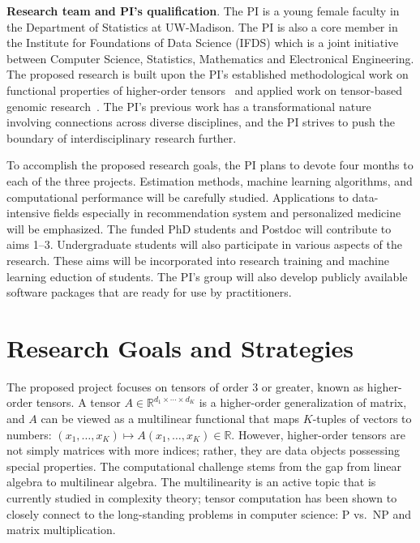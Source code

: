 \documentclass[10pt]{article}
\theoremstyle{definition}
\theoremstyle{definition}
\theoremstyle{definition}
\begin{document}
{\bf Research team and PI's qualification}. The PI is a young female faculty in the Department of Statistics at UW-Madison. The PI is also a core member in the Institute for Foundations of Data Science (IFDS) which is a joint initiative between Computer Science, Statistics, Mathematics and Electronical Engineering. The proposed research is built upon the PI’s established methodological work on functional properties of higher-order tensors~\cite{wang2017operator, wang2017tensor,zeng2019multiway,wang2018learning,lee2020tensor} and applied work on tensor-based genomic research~\cite{wang2019three,wang2018two}. The PI’s previous work has a transformational nature involving connections across diverse disciplines, and the PI strives to push the boundary of interdisciplinary research further.

To accomplish the proposed research goals, the PI plans to devote four months to each of the three projects. Estimation methods, machine learning algorithms, and computational performance will be carefully studied. Applications to data-intensive fields especially in recommendation system and personalized medicine will be emphasized. The funded PhD students and Postdoc will contribute to aims 1--3. Undergraduate students will also participate in various aspects of the research. These aims will be incorporated into research training and machine learning eduction of students. The PI’s group will also develop publicly available software packages that are ready for use by practitioners.


\section{Research Goals and Strategies} 
The proposed project focuses on tensors of order 3 or greater, known as higher-order tensors. A tensor $A \in  \mathbb{R}^{d_1 \times\cdots \times d_K}$ is a higher-order generalization of matrix, and $A$ can be viewed as a multilinear functional that maps $K$-tuples of vectors to numbers: $(x_1,\ldots,x_K)  \mapsto A(x_1,\ldots,x_K) \in \mathbb{R}$. However, higher-order tensors are not simply matrices with more indices; rather, they are data objects possessing special  properties. The computational challenge stems from the gap from linear algebra to multilinear algebra. The multilinearity is an active topic that is currently studied in complexity theory; tensor computation has been shown to closely connect to the long-standing problems in computer science: P vs.\ NP and matrix multiplication. 
\end{document}
